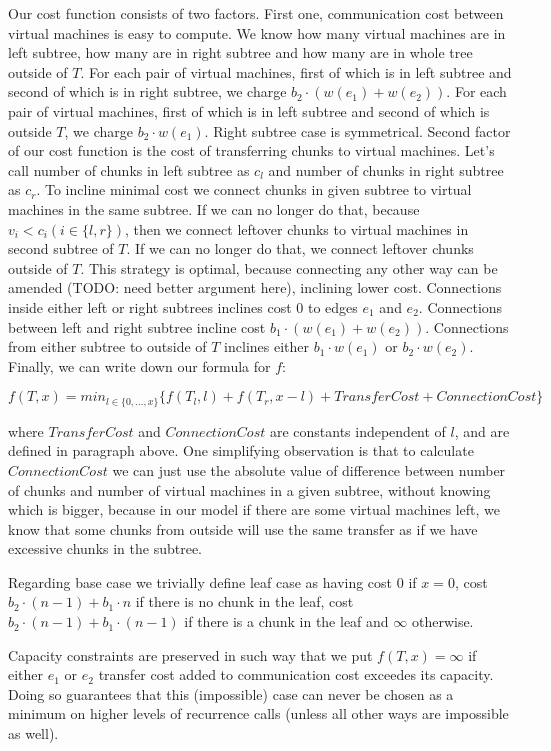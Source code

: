 \documentclass[9pt,twocolumn]{scrartcl}
\begin{document}
Our cost function consists of two factors. First one, communication cost
between virtual machines is easy to compute. We know how many virtual
machines are in left subtree, how many are in right subtree and how
many are in whole tree outside of $T$. For each pair of virtual
machines, first of which is in left subtree and second of which is in
right subtree, we charge $b_2 \cdot (w(e_1) + w(e_2))$. For each pair
of virtual machines, first of which is in left subtree and second of
which is outside $T$, we charge $b_2 \cdot w(e_1)$. Right subtree case
is symmetrical. Second factor of our cost function is the cost of
transferring chunks to virtual machines. Let's call number of chunks
in left subtree as $c_l$ and number of chunks in right subtree as
$c_r$. To incline minimal cost we connect chunks in given subtree to
virtual machines in the same subtree. If we can no longer do that,
because $v_i < c_i (i \in \{l,r\})$, then we connect leftover chunks
to virtual machines in second subtree of $T$. If we can no longer do
that, we connect leftover chunks outside of $T$. This strategy is
optimal, because connecting any other way can be amended (TODO: need
better argument here), inclining lower cost. Connections inside either
left or right subtrees inclines cost $0$ to edges $e_1$ and
$e_2$. Connections between left and right subtree incline cost $b_1
\cdot (w(e_1) + w(e_2))$. Connections from either subtree to outside
of $T$ inclines either $b_1 \cdot w(e_1)$ or $b_2 \cdot
w(e_2)$. Finally, we can write down our formula for $f$:

$$ f(T, x) = min_{l \in \{0, \ldots, x\}} \{ f(T_l, l) + f(T_r, x - l)
+ TransferCost + ConnectionCost\} $$

where $TransferCost$ and $ConnectionCost$ are constants independent of
$l$, and are defined in paragraph above. One simplifying observation
is that to calculate $ConnectionCost$ we can just use the absolute
value of difference
between number of chunks and number of virtual machines in a given
subtree, without knowing which is bigger, because in our model if
there are some virtual machines left, we know that some chunks from
outside will use the same transfer as if we have excessive chunks in
the subtree.

Regarding base case we
trivially define leaf case as having cost $0$ if $x = 0$, cost $b_2
\cdot (n-1) + b_1\cdot n$ if there is no chunk in the leaf, cost $b_2 \cdot (n-1) +
b_1 \cdot (n-1)$ if there is a chunk in the leaf and $\infty$ otherwise.

Capacity constraints are preserved in such way that we put $f(T, x) =
\infty$ if either $e_1$ or $e_2$ transfer cost added to communication
cost exceedes its capacity. Doing so guarantees that this
(impossible) case can never be chosen as a minimum on higher levels of
recurrence calls (unless all other ways are impossible as well).
\end{document}
